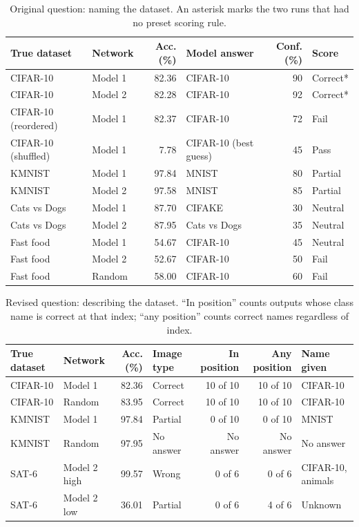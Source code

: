 \documentclass[11pt]{article}
\begin{document}
\begin{table}[H]
  \centering
  \caption{Original question: naming the dataset. An asterisk marks the two runs that had no preset scoring rule.}
  \small
  \begin{tabular}{@{}llrlrl@{}}
    \toprule
    True dataset & Network & Acc. (\%) & Model answer & Conf. (\%) & Score \\
    \midrule
    CIFAR-10 & Model 1 & 82.36 & CIFAR-10 & 90 & Correct* \\
    CIFAR-10 & Model 2 & 82.28 & CIFAR-10 & 92 & Correct* \\
    CIFAR-10 (reordered) & Model 1 & 82.37 & CIFAR-10 & 72 & Fail \\
    CIFAR-10 (shuffled) & Model 1 & 7.78 & CIFAR-10 (best guess) & 45 & Pass \\
    KMNIST & Model 1 & 97.84 & MNIST & 80 & Partial \\
    KMNIST & Model 2 & 97.58 & MNIST & 85 & Partial \\
    Cats vs Dogs & Model 1 & 87.70 & CIFAKE & 30 & Neutral \\
    Cats vs Dogs & Model 2 & 87.95 & Cats vs Dogs & 35 & Neutral \\
    Fast food & Model 1 & 54.67 & CIFAR-10 & 45 & Neutral \\
    Fast food & Model 2 & 52.67 & CIFAR-10 & 50 & Fail \\
    Fast food & Random & 58.00 & CIFAR-10 & 60 & Fail \\
    \bottomrule
  \end{tabular}
\end{table}

\begin{table}[H]
  \centering
  \caption{Revised question: describing the dataset. ``In position'' counts outputs whose class name is correct at that index; ``any position'' counts correct names regardless of index.}
  \small
  \setlength{\tabcolsep}{4pt}
  \begin{tabular}{@{}llrlrrl@{}}
    \toprule
    True dataset & Network & Acc. (\%) & Image type & In position & Any position & Name given \\
    \midrule
    CIFAR-10 & Model 1 & 82.36 & Correct & 10 of 10 & 10 of 10 & CIFAR-10 \\
    CIFAR-10 & Random & 83.95 & Correct & 10 of 10 & 10 of 10 & CIFAR-10 \\
    KMNIST & Model 1 & 97.84 & Partial & 0 of 10 & 0 of 10 & MNIST \\
    KMNIST & Random & 97.95 & No answer & No answer & No answer & No answer \\
    SAT-6 & Model 2 high & 99.57 & Wrong & 0 of 6 & 0 of 6 & CIFAR-10, animals \\
    SAT-6 & Model 2 low & 36.01 & Partial & 0 of 6 & 4 of 6 & Unknown \\
    \bottomrule
  \end{tabular}
\end{table}
\end{document}
